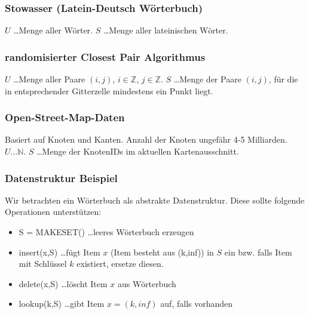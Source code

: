 



\subsubsection{Stowasser (Latein-Deutsch Wörterbuch)}
$U$ \dots Menge aller Wörter. $S$ \dots Menge aller lateinischen Wörter.

\subsubsection{randomisierter Closest Pair Algorithmus}
$U$ \dots Menge aller Paare $(i,j)$, $i \in \mathbb{Z}$, $j \in \mathbb{Z}$. $S$ \dots Menge der Paare $(i,j)$, für die in entsprechender Gitterzelle mindestens ein Punkt liegt.

\subsubsection{Open-Street-Map-Daten}
Basiert auf Knoten und Kanten. Anzahl der Knoten ungefähr 4-5 Milliarden. $U \dots \mathbb{N}$. $S$ \dots Menge der KnotenIDs im aktuellen Kartenausschnitt.


\subsubsection{Datenstruktur Beispiel}
Wir betrachten ein Wörterbuch als abstrakte Datenstruktur. Diese sollte folgende Operationen unterstützen:
\begin{itemize}
	\item[] S = MAKESET() \dots leeres Wörterbuch erzeugen
	\item[] insert(x,S) \dots fügt Item $x$ (Item besteht aus (k,inf)) in $S$ ein bzw. falls Item mit Schlüssel $k$ existiert, ersetze diesen.
	\item[] delete(x,S) \dots löscht Item $x$ aus Wörterbuch
	\item[] lookup(k,S) \dots gibt Item $x = (k,inf)$ auf, falls vorhanden
\end{itemize}


